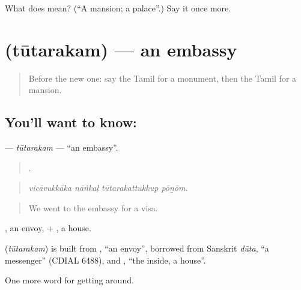 \begin{tcolorbox}[breakable,colback=teal!4,colframe=teal!35!black,title={Before you move on}]
What does  mean? (\textquotedblleft{}A mansion; a palace\textquotedblright{}.) Say it once more.
\end{tcolorbox}
\section[\texorpdfstring{\ta{தூதரகம்} (tūtarakam)}{தூதரகம் (tūtarakam)}]{ (tūtarakam) — an embassy}

\label{lesson:TA-C424-tutarakam}



\begin{quote}
Before the new one: say the Tamil for a monument, then the Tamil for a mansion.
\end{quote}

\subsection*{You'll want to know: }
\textbf{} — \emph{tūtarakam} — \textquotedblleft{}an embassy\textquotedblright{}.

\begin{quote}
   .
\end{quote}

\begin{quote}
\emph{vicāvukkāka nāṅkaḷ tūtarakattukkup pōṉōm.}
\end{quote}

\begin{quote}
We went to the embassy for a visa.
\end{quote}

, an envoy, + , a house.

\begin{cousinweb}
\textbf{} (\emph{tūtarakam}) is built from , \textquotedblleft{}an envoy\textquotedblright{}, borrowed from Sanskrit \emph{dūta}, \textquotedblleft{}a messenger\textquotedblright{} (CDIAL 6488), and , \textquotedblleft{}the inside, a house\textquotedblright{}.
\end{cousinweb}

\begin{grammarlens}[title={What you've built}]
One more word for getting around.
\end{grammarlens}

